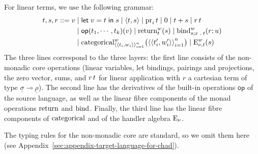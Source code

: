 \documentclass[11pt,a4paper]{article}
\theoremstyle{definition}
\theoremstyle{remark}
\providecommand{\srcop}{\mathsf{op}}
\providecommand{\tgtop}{\mathsf{op}}
\providecommand{\letst}[3]{\mathsf{let}\;#1=#2\;\mathsf{in}\;#3}
\providecommand{\lintype}[1]{\underline{#1}}
\providecommand{\linto}{\multimap}
\begin{document}
For linear terms, we use the following grammar:
\begin{equation}
  \label{eq:target-language-linear-term-construction-grammar}
  \begin{aligned}
    t, s, r
    ::=
    v
    &\mid
      \letst{v}{t}{s}
      \mid
      \tuple{ t, s }
      \mid
      \opn[b]{pr}_{i} t
      \mid
      \opn[b]{0}
      \mid
      t + s
      \mid
      \linapp{r}{t}
    \\
    &
      \mid
      \fn[n]{ \fn[n]{ \tgtop }{ t_{1}, \cdots, t_{k} } }{v}
      \mid
      \fn[n]{ \opn[b]{return}^{w}_{t} }{s}
      \mid
      \fn[n]{ \opn[b]{bind}^{w}_{s; x \; . \; t} }{r; u}
    \\
    &
      \mid
      \fn[n]{ \opn[b]{categorical}^{w}_{\tuple{ \tuple{ t_{i}, w_{i} } }_{i = 1}^{n}} }{
      \tuple{ \tuple{ t_{i}', w_{i}' } }_{i = 1}^{n}
      }
      \mid
      \fn[n]{ \opn[b]{E}^{w}_{\nu, t} }{ s }
  \end{aligned}
\end{equation}
The three lines correspond to the three layers: the first line consists of the non-monadic core operations (linear variables, let bindings, pairings and projections, the zero vector, sums, and \( r\, t \) for linear application with \( r \) a cartesian term of type \( \lintype{\sigma} \linto \lintype{\rho} \)). The second line has the derivatives of the built-in operations \( \srcop \) of the source language, as well as the linear fibre components of the monad operations \( \opn[b]{return} \) and \( \opn[b]{bind} \). Finally, the third line has the linear fibre components of \( \opn[b]{categorical} \) and of the handler algebra \( \opn[b]{E}_{\nu} \).

The typing rules for the non-monadic core are standard, so we omit them here (see Appendix~\ref{sec:appendix-target-language-for-chad}).
\end{document}
